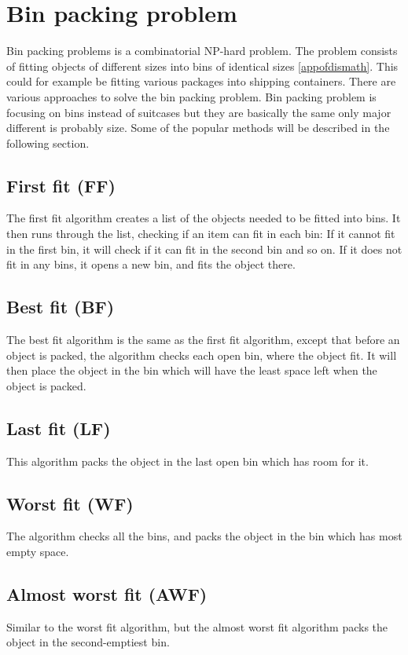 \section{Bin packing problem}
\label{sec:binpacking}
Bin packing problems is a combinatorial NP-hard problem. The problem consists of fitting objects of different sizes into bins of identical sizes \ref{appofdismath}. This could for example be fitting various packages into shipping containers. There are various approaches to solve the bin packing problem. Bin packing problem is focusing on bins instead of suitcases but they are basically the same only major different is probably size. Some of the popular methods will be described in the following section.

\subsection*{First fit (FF)}
The first fit algorithm creates a list of the objects needed to be fitted into bins. It then runs through the list, checking if an item can fit in each bin: If it cannot fit in the first bin, it will check if it can fit in the second bin and so on. If it does not fit in any bins, it opens a new bin, and fits the object there. 

\subsection*{Best fit (BF)}
The best fit algorithm is the same as the first fit algorithm, except that before an object is packed, the algorithm checks each open bin, where the object fit. It will then place the object in the bin which will have the least space left when the object is packed. 

\subsection*{Last fit (LF)}
This algorithm packs the object in the last open bin which has room for it.

\subsection*{Worst fit (WF)}
The algorithm checks all the bins, and packs the object in the bin which has most empty space.

\subsection*{Almost worst fit (AWF)}
Similar to the worst fit algorithm, but the almost worst fit algorithm packs the object in the second-emptiest bin. 

